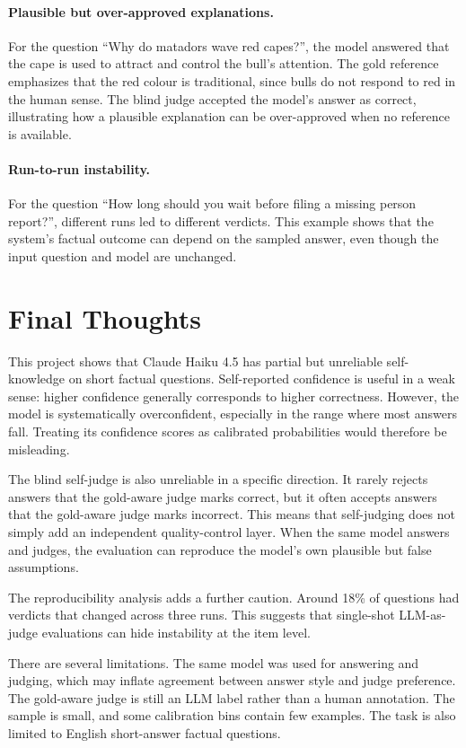 \documentclass[11pt,a4paper]{article}
\begin{document}
\paragraph{Plausible but over-approved explanations.}
For the question ``Why do matadors wave red capes?'', the model answered that the cape is used to attract and control the bull's attention. The gold reference emphasizes that the red colour is traditional, since bulls do not respond to red in the human sense. The blind judge accepted the model's answer as correct, illustrating how a plausible explanation can be over-approved when no reference is available.

\paragraph{Run-to-run instability.}
For the question ``How long should you wait before filing a missing person report?'', different runs led to different verdicts. This example shows that the system's factual outcome can depend on the sampled answer, even though the input question and model are unchanged.

\section{Final Thoughts}

This project shows that Claude Haiku 4.5 has partial but unreliable self-knowledge on short factual questions. Self-reported confidence is useful in a weak sense: higher confidence generally corresponds to higher correctness. However, the model is systematically overconfident, especially in the range where most answers fall. Treating its confidence scores as calibrated probabilities would therefore be misleading.

The blind self-judge is also unreliable in a specific direction. It rarely rejects answers that the gold-aware judge marks correct, but it often accepts answers that the gold-aware judge marks incorrect. This means that self-judging does not simply add an independent quality-control layer. When the same model answers and judges, the evaluation can reproduce the model's own plausible but false assumptions.

The reproducibility analysis adds a further caution. Around 18\% of questions had verdicts that changed across three runs. This suggests that single-shot LLM-as-judge evaluations can hide instability at the item level.

There are several limitations. The same model was used for answering and judging, which may inflate agreement between answer style and judge preference. The gold-aware judge is still an LLM label rather than a human annotation. The sample is small, and some calibration bins contain few examples. The task is also limited to English short-answer factual questions.
\end{document}
